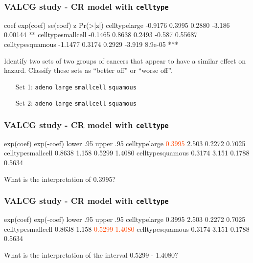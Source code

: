\begin{frame}[fragile]
\frametitle{VALCG study - CR model with \texttt{celltype}}
\begin{Rout}{-.05}
                     coef exp(coef) se(coef)      z Pr(>|z|)
celltypelarge     -0.9176    0.3995   0.2880 -3.186  0.00144 **
celltypesmallcell -0.1465    0.8638   0.2493 -0.587  0.55687
celltypesquamous  -1.1477    0.3174   0.2929 -3.919  8.9e-05 ***
\end{Rout}
\begin{clicker}{Identify two sets of two groups of cancers that appear to have a similar effect on hazard.  Classify these sets as ``better off'' or ``worse off''.}
\begin{itemize}
\item[]
\item[Set 1:] \hspace{0.2in} \texttt{adeno} \hspace{0.2in} \texttt{large} \hspace{0.2in} \texttt{smallcell} \hspace{0.2in} \texttt{squamous}
\item[]
\item[Set 2:] \hspace{0.2in} \texttt{adeno} \hspace{0.2in} \texttt{large} \hspace{0.2in} \texttt{smallcell} \hspace{0.2in} \texttt{squamous}
\item[]
\end{itemize}
\end{clicker}
\end{frame}

\begin{frame}[fragile]
\frametitle{VALCG study - CR model with \texttt{celltype}}
\begin{Rout}{-.05}
                  exp(coef) exp(-coef) lower .95 upper .95
celltypelarge        \textcolor{OrangeRed}{0.3995}      2.503    0.2272    0.7025
celltypesmallcell    0.8638      1.158    0.5299    1.4080
celltypesquamous     0.3174      3.151    0.1788    0.5634
\end{Rout}
What is the interpretation of 0.3995?
\vskip200pt
\end{frame}

\begin{frame}[fragile]
\frametitle{VALCG study - CR model with \texttt{celltype}}
\begin{Rout}{-.05}
                  exp(coef) exp(-coef) lower .95 upper .95
celltypelarge        0.3995      2.503    0.2272    0.7025
celltypesmallcell    0.8638      1.158    \textcolor{OrangeRed}{0.5299}    \textcolor{OrangeRed}{1.4080}
celltypesquamous     0.3174      3.151    0.1788    0.5634
\end{Rout}
What is the interpretation of the interval 0.5299 - 1.4080?
\vskip200pt
\end{frame}


